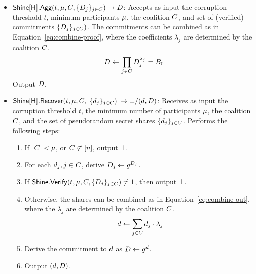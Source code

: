 \begin{itemize}
  \item $\mathsf{Shine}[\mathsf{H}].\mathsf{Agg}(t, \mu, C, \{ D_j \}_{j \in C}) \rightarrow D $:
    Accepts as input the corruption threshold $t$,
    minimum participants $\mu$,
    the coalition $C$,
    and set of (verified) commitments $\{ D_j \}_{j \in C})$.
    The commitments can be combined as in Equation~\ref{eq:combine-proof},
    where the coefficients $\lambda_j$ are determined by the coalition $C$.
        \begin{equation} \label{eq:combine-proof}
          D \gets \prod_{j \in C} D_j^{\lambda_j} = B_0
        \end{equation}
    Output $D$.

  \item $\mathsf{Shine}[\mathsf{H}].\mathsf{Recover}(t, \mu, C,$
    $\{ d_j \}_{j \in C})$
    $\rightarrow  \bot/(d, D)$:
    Receives as input the corruption threshold $t$,
    the minimum number of participants $\mu$,
    the coalition $C$,
    and the set of pseudorandom secret shares $\{ d_j \}_{j \in C}$.
    Performs the following steps:
    \begin{enumerate}
      \item If $\lvert C \rvert < \mu$,
        or $C \not\subset [n]$,
        output $\bot$.
      \item For each $d_j, j \in C$,
        derive $D_j \gets g^{D_j}$.
      \item If $\mathsf{Shine}.\mathsf{Verify}(t, \mu, C, \{ D_j\}_{j \in C}) \neq 1$,
        then output $\bot$.
      \item Otherwise, the shares can be combined as in Equation~\ref{eq:combine-out},
    where the $\lambda_j$ are determined by the coalition $C$.
        \begin{equation} \label{eq:combine-out}
          d \gets \sum_{j \in C} d_j \cdot \lambda_j
        \end{equation}
      \item Derive the commitment to $d$ as $D \gets g^{d}$.
      \item Output $(d, D)$.
    \end{enumerate}

\end{itemize}

